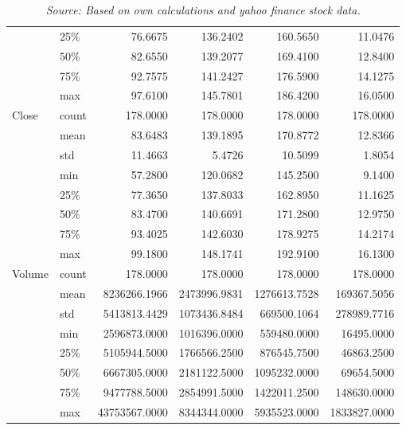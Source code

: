 \documentclass[11pt]{article} %
\begin{document}
\begin{table}[hbt!]
\begin{tabular}{llrrrr}
       & 25\% &       76.6675 &     136.2402 &     160.5650 &      11.0476 \\
       & 50\% &       82.6550 &     139.2077 &     169.4100 &      12.8400 \\
       & 75\% &       92.7575 &     141.2427 &     176.5900 &      14.1275 \\
       & max &       97.6100 &     145.7801 &     186.4200 &      16.0500 \\
Close & count &      178.0000 &     178.0000 &     178.0000 &     178.0000 \\
       & mean &       83.6483 &     139.1895 &     170.8772 &      12.8366 \\
       & std &       11.4663 &       5.4726 &      10.5099 &       1.8054 \\
       & min &       57.2800 &     120.0682 &     145.2500 &       9.1400 \\
       & 25\% &       77.3650 &     137.8033 &     162.8950 &      11.1625 \\
       & 50\% &       83.4700 &     140.6691 &     171.2800 &      12.9750 \\
       & 75\% &       93.4025 &     142.6030 &     178.9275 &      14.2174 \\
       & max &       99.1800 &     148.1741 &     192.9100 &      16.1300 \\
Volume & count &      178.0000 &     178.0000 &     178.0000 &     178.0000 \\
       & mean &  8236266.1966 & 2473996.9831 & 1276613.7528 &  169367.5056 \\
       & std &  5413813.4429 & 1073436.8484 &  669500.1064 &  278989.7716 \\
       & min &  2596873.0000 & 1016396.0000 &  559480.0000 &   16495.0000 \\
       & 25\% &  5105944.5000 & 1766566.2500 &  876545.7500 &   46863.2500 \\
       & 50\% &  6667305.0000 & 2181122.5000 & 1095232.0000 &   69654.5000 \\
       & 75\% &  9477788.5000 & 2854991.5000 & 1422011.2500 &  148630.0000 \\
       & max & 43753567.0000 & 8344344.0000 & 5935523.0000 & 1833827.0000 \\
\bottomrule
\end{tabular}
\caption*{\textit{Source: Based on own calculations and yahoo finance stock data.}}
\end{table}

\clearpage
\end{document}
